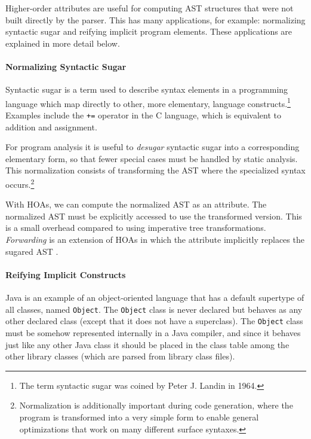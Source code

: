 \documentclass[10pt, twoside, openright]{book}
\begin{document}
Higher-order attributes are useful for computing AST structures that were not built directly
by the parser. This has many applications, for example:
normalizing syntactic sugar and reifying implicit
program elements. These applications are explained in more detail below.

\newpage
\paragraph{Normalizing Syntactic Sugar}

Syntactic sugar is a term used to describe syntax elements in a programming language
which map directly to other, more elementary, language constructs.\footnote{The term syntactic sugar was coined by
Peter J. Landin in 1964.}
Examples include the \verb'+=' operator in the C language,
which is equivalent to addition and assignment.

For program analysis it is useful to
\emph{desugar} syntactic sugar into a corresponding elementary form, so that fewer special cases
must be handled by static analysis. This normalization consists of transforming the AST where
the specialized syntax occurs.\footnote{Normalization is additionally important during code
generation, where the program is transformed into a very simple form to enable general optimizations
that work on many different surface syntaxes.}

With HOAs, we can compute the normalized AST as an attribute. The normalized AST must be explicitly
accessed to use the transformed version. This is a small overhead compared to using imperative tree
transformations.  \emph{Forwarding} is an extension of HOAs in which the attribute implicitly replaces the
sugared AST \cite{DBLP:conf/cc/WykMBK02}.


\paragraph{Reifying Implicit Constructs}

Java is an example of an object-oriented language that has a default supertype of all classes, named
\texttt{Object}. The \texttt{Object} class is never declared but behaves as any other declared class (except that it
does not have a superclass). The \texttt{Object} class must be somehow represented internally in a Java
compiler, and since it behaves just like any other Java class it should be placed in the class
table among the other library classes (which are parsed from library class files).
\end{document}
